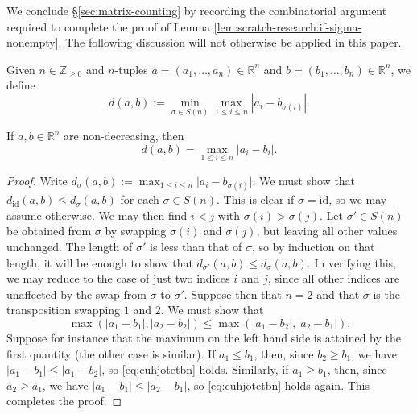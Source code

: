 We conclude \S\ref{sec:matrix-counting} by recording the combinatorial argument required to complete the proof of Lemma \ref{lem:scratch-research:if-sigma-nonempty}.  The following discussion will not otherwise be applied in this paper.
\begin{definition}
  Given $n \in \mathbb{Z}_{\geq 0}$ and $n$-tuples $a = (a_1,\dotsc,a_n) \in \mathbb{R}^n$ and $b = (b_1,\dotsc,b_n)\in \mathbb{R}^n$, we define
  \begin{equation*}
    d(a,b) := \min_{\sigma \in S(n)}
    \max_{1 \leq i \leq n}
    |a_i - b_{\sigma(i)}|.
  \end{equation*}
\end{definition}
\begin{lemma}\label{lem:manhattan-greedy}
  If $a,b \in \mathbb{R}^n$ are non-decreasing, then
  \begin{equation*}
    d(a,b) = \max_{1 \leq i \leq n} |a_i - b_i|.
  \end{equation*}
\end{lemma}
\begin{proof}
  Write $d_\sigma(a, b) := \max_{1 \leq i \leq n} \lvert a_i - b_{\sigma(i)} \rvert$.  We must show that $d_{\mathrm{id}}(a,b) \leq d_\sigma(a,b)$ for each $\sigma \in S(n)$.  This is clear if $\sigma = \mathrm{id}$, so we may assume otherwise.  We may then find $i < j$ with $\sigma(i) > \sigma(j)$.  Let $\sigma' \in S(n)$ be obtained from $\sigma$ by swapping $\sigma(i)$ and $\sigma(j)$, but leaving all other values unchanged.  The length of $\sigma'$ is less than that of $\sigma$, so by induction on that length, it will be enough to show that $d_{\sigma'}(a,b) \leq d_{\sigma}(a,b)$.  In verifying this, we may reduce to the case of just two indices $i$ and $j$, since all other indices are unaffected by the swap from $\sigma$ to $\sigma'$.  Suppose then that $n=2$ and that $\sigma$ is the transposition swapping $1$ and $2$.  We must show that
  \begin{equation}\label{eq:cuhjotetbn}
    \max(\lvert a_1 - b_1 \rvert, \lvert a_2 - b_2 \rvert) \leq \max(\lvert a_1 - b_2 \rvert, \lvert a_2 - b_1 \rvert).
  \end{equation}
  Suppose for instance that the maximum on the left hand side is attained by the first quantity (the other case is similar).  If $a_1 \leq b_1$, then, since $b_2 \geq b_1$, we have $\lvert a_1 - b_1 \rvert \leq \lvert a_1 - b_2 \rvert$, so \eqref{eq:cuhjotetbn} holds.  Similarly, if $a_1 \geq b_1$, then, since $a_2 \geq a_1$, we have $\lvert a_1 - b_1 \rvert \leq \lvert a_2 - b_1 \rvert$, so \eqref{eq:cuhjotetbn} holds again.  This completes the proof.
\end{proof}
